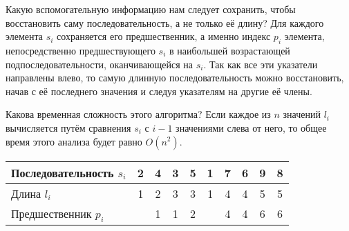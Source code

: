 Какую вспомогательную информацию нам следует сохранить, чтобы восстановить саму
последовательность, а не только её длину? Для каждого элемента $s_i$ сохраняется его
предшественник, а именно индекс $p_i$ элемента, непосредственно предшествующего $s_i$
в наибольшей возрастающей подпоследовательности, оканчивающейся на $s_i$. Так как все
эти указатели направлены влево, то самую длинную последовательность можно восстановить,
начав с её последнего значения и следуя указателям на другие её члены.

Какова временная сложность этого алгоритма? Если каждое из $n$ значений $l_i$ вычисляется
путём сравнения $s_i$ с $i-1$ значениями слева от него, то общее время этого анализа
будет равно $O(n^2)$.

\begin{tabular}{l|c|c|c|c|c|c|c|c|c}
Последовательность $s_i$ & 2 & 4 & 3 & 5 & 1 & 7 & 6 & 9 & 8 \\
\hline
Длина $l_i$              & 1 & 2 & 3 & 3 & 1 & 4 & 4 & 5 & 5 \\
\hline
Предшественник $p_i$     &   & 1 & 1 & 2 &   & 4 & 4 & 6 & 6 \\
\end{tabular}

